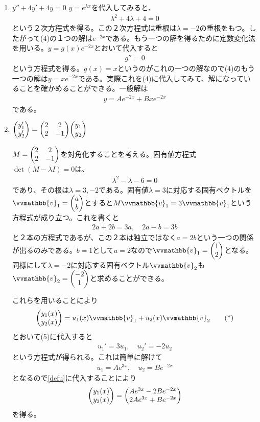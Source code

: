\documentclass[report,paper=a4, fontsize=12pt, line_length=16cm, number_of_lines=33,dvipdfmx]{jlreq}
\numberwithin{equation}{section}
\renewcommand{\vb}{\vvmathbb{v}}
\begin{document}
\begin{enumerate}
\item $\displaystyle y''+4y'+4y=0$
$y=e^{\lambda x}$を代入してみると、
\begin{align*}
    \lambda^2+4\lambda+4=0
\end{align*}
という２次方程式を得る。この２次方程式は重根は$\lambda=-2$の重根をもつ。したがって(4)の１つの解は$e^{-2x}$である。もう一つの解を得るために定数変化法を用いる。$y=g(x)e^{-2x}$とおいて代入すると
\begin{align*}
    g''=0
\end{align*}
という方程式を得る。$g(x)=x$というのがこれの一つの解なので(4)のもう一つの解は$y=xe^{-2x}$である。実際これを(4)に代入してみて、解になっていることを確かめることができる。一般解は
\begin{align*}
    y=Ae^{-2x}+Bxe^{-2x}
\end{align*}
である。

\item $\displaystyle \mqty(y_1'\\ y_2')=\mqty(
  2 & 2 \\
  2 & -1
)
  \mqty(y_1\\y_2)
$

$M=\mqty(
    2 & 2 \\
    2 & -1
  )$を対角化することを考える。固有値方程式$\det(M-\lambda I)=0$は、
\begin{align*}
    \lambda^2-\lambda-6=0
\end{align*}
であり、その根は$\lambda=3,-2$である。固有値$\lambda=3$に対応する固有ベクトルを
$\vb_1=
\mqty(a\\b)$とすると$M\vb_1=3\vb_1$という方程式が成り立つ。これを書くと
\begin{align*}
    2a+2b=3a,\quad 2a-b=3b
\end{align*}
と２本の方程式であるが、この２本は独立ではなく$a=2b$という一つの関係が出るのみである。$b=1$として$a=2$なので$\vb_1=\mqty(1\\2)$となる。同様にして$\lambda=-2$に対応する固有ベクトル$\vb_2$も$\vb_2=\mqty(-2\\1)$と求めることができる。

これらを用いることにより
\begin{align}
    \mqty(y_1(x)\\ y_2(x))=u_1(x)\vb_1+u_2(x)\vb_2
    \tag{*}\label{defu}
\end{align}
とおいて(5)に代入すると
\begin{align*}
    u_1'=3u_1,\quad u_2'=-2u_2
\end{align*}
という方程式が得られる。これは簡単に解けて
\begin{align*}
    u_1=Ae^{3x},\quad u_2=Be^{-2x}
\end{align*}
となるので\eqref{defu}に代入することにより
\begin{align*}
    \mqty(y_1(x)\\ y_2(x))=\mqty(Ae^{3x}-2Be^{-2x} \\ 2Ae^{3x}+Be^{-2x})
\end{align*}
を得る。
\end{enumerate}
\end{document}
